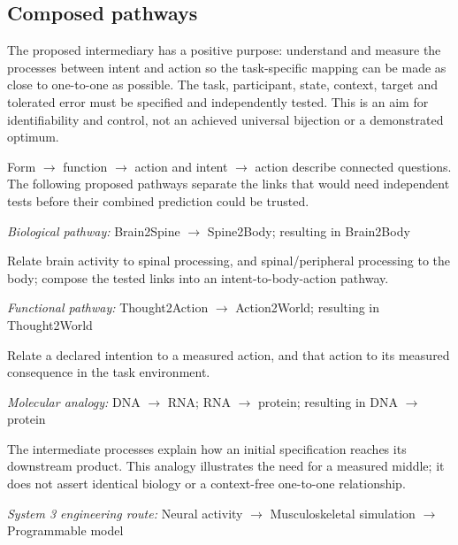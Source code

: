 \begin{samepage}
\subsection*{Composed pathways}
\noindent The proposed intermediary has a positive purpose: understand and measure the processes between intent and action so the task-specific mapping can be made as close to one-to-one as possible. The task, participant, state, context, target and tolerated error must be specified and independently tested. This is an aim for identifiability and control, not an achieved universal bijection or a demonstrated optimum.\par
\end{samepage}
\noindent Form \texorpdfstring{\ensuremath{\rightarrow}}{->} function \texorpdfstring{\ensuremath{\rightarrow}}{->} action and intent \texorpdfstring{\ensuremath{\rightarrow}}{->} action describe connected questions. The following proposed pathways separate the links that would need independent tests before their combined prediction could be trusted.\par
\noindent\textit{Biological pathway:} Brain2Spine \texorpdfstring{\ensuremath{\rightarrow}}{->} Spine2Body; resulting in Brain2Body\par
\noindent Relate brain activity to spinal processing, and spinal/peripheral processing to the body; compose the tested links into an intent-to-body-action pathway.\par
\noindent\textit{Functional pathway:} Thought2Action \texorpdfstring{\ensuremath{\rightarrow}}{->} Action2World; resulting in Thought2World\par
\noindent Relate a declared intention to a measured action, and that action to its measured consequence in the task environment.\par
\noindent\textit{Molecular analogy:} DNA \texorpdfstring{\ensuremath{\rightarrow}}{->} RNA; RNA \texorpdfstring{\ensuremath{\rightarrow}}{->} protein; resulting in DNA \texorpdfstring{\ensuremath{\rightarrow}}{->} protein\par
\noindent The intermediate processes explain how an initial specification reaches its downstream product. This analogy illustrates the need for a measured middle; it does not assert identical biology or a context-free one-to-one relationship.\par
\noindent\textit{System 3 engineering route:} Neural activity \texorpdfstring{\ensuremath{\rightarrow}}{->} Musculoskeletal simulation \texorpdfstring{\ensuremath{\rightarrow}}{->} Programmable model\par

